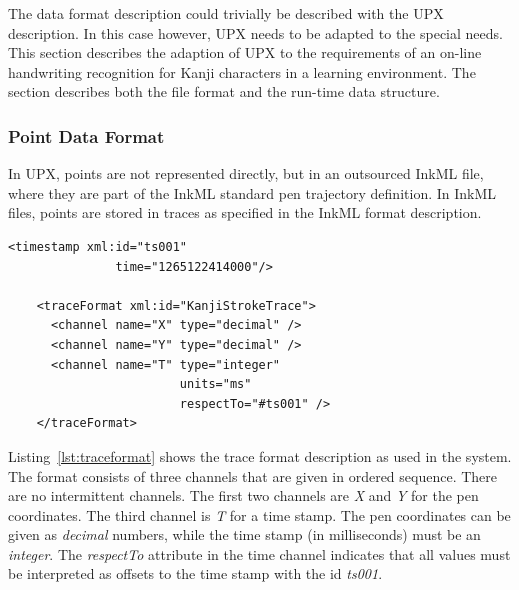 The data format description could trivially be described with the UPX 
description. In this case however, UPX needs to be adapted to the special needs.
This section describes the adaption of UPX to the requirements of an on-line
handwriting recognition for Kanji characters in a learning environment.
The section describes both the file format and the run-time data structure.

\subsubsection{Point Data Format}
\label{sec:hwre:pointdataformat}

In UPX, points are not represented directly, but in an outsourced InkML file,
where they are part of the InkML standard pen trajectory definition. In InkML
files, points are stored in traces as specified in the InkML format description.
\begin{xmlcode}
  \begin{lstlisting}[emph={traceFormat,channel,timestamp},
                     emphstyle=\color{blue}\textbf,
                     emph={[2]name,type,units,respectTo,id,time},
                     emphstyle={[2]\color{red}},
                     caption={Definition of the trace format},
                     label=lst:traceformat]
    <timestamp xml:id="ts001" 
               time="1265122414000"/>
                   
    <traceFormat xml:id="KanjiStrokeTrace">
      <channel name="X" type="decimal" />
      <channel name="Y" type="decimal" />
      <channel name="T" type="integer"
                        units="ms"
                        respectTo="#ts001" />
    </traceFormat>
  \end{lstlisting}
\end{xmlcode}
Listing~\ref{lst:traceformat} shows the trace format description as used in
the system. The format consists of three channels that are given in ordered 
sequence. There are no intermittent channels. The first two channels are \emph{X}
and \emph{Y} for the pen coordinates. The third channel is \emph{T} for a time 
stamp. The pen coordinates can be given as \emph{decimal} numbers, while the
time stamp (in milliseconds) must be an \emph{integer}.
The \emph{respectTo} attribute in the time channel indicates that all values
must be interpreted as offsets to the time stamp with the id \emph{ts001}.

